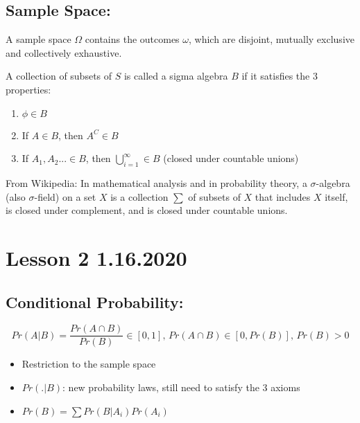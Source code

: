 \documentclass[11pt,letterpaper,titlepage]{article}
\begin{document}
\subsection{Sample Space:}

A sample space $\Omega$ contains the outcomes $\omega$, which are disjoint, mutually exclusive and collectively exhaustive.

A collection of subsets of $S$ is called a sigma algebra $B$ if it satisfies the 3 properties:

\begin{enumerate}
    \item $\phi \in B$
    
    \item If $A \in B$, then $A^C \in B$
    
    \item If $A_1, A_2... \in B$, then $\bigcup\limits_{i=1}^{\infty} \in B$ (closed under countable unions)
\end{enumerate}

From Wikipedia: In mathematical analysis and in probability theory, a $\sigma$-algebra (also $\sigma$-field) on a set $X$ is a collection $\sum$ of subsets of $X$ that includes $X$ itself, is closed under complement, and is closed under countable unions.

\newpage

\section{Lesson 2 1.16.2020}

\subsection{Conditional Probability:}

\begin{equation*}
    Pr(A|B) = \frac{Pr(A\cap B)}{Pr(B)} \in [0, 1] \text{, } Pr(A\cap B) \in [0, Pr(B)] \text{, } Pr(B) > 0
\end{equation*}

\begin{itemize}
    \item Restriction to the sample space
    
    \item $Pr(.|B)$: new probability laws, still need to satisfy the 3 axioms
    
    \item $Pr(B) = \sum Pr(B|A_i)Pr(A_i)$
\end{itemize}
\end{document}
